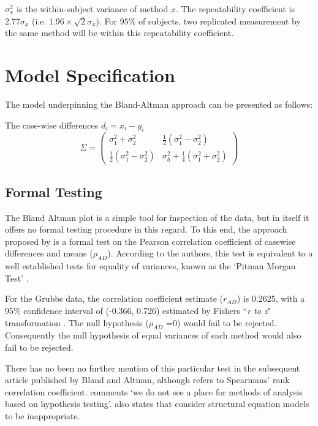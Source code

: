 \documentclass[12pt, a4paper]{report}
\theoremstyle{plain}
\theoremstyle{definition}
\theoremstyle{remark}
\begin{document}
$\sigma^2_{x}$ is the within-subject variance of method $x$. The repeatability coefficient is $2.77 \sigma_{x}$ (i.e. $1.96 \times \sqrt{2} \sigma_{x}$). For $95\%$ of subjects, two replicated measurement by the same method will be within this repeatability coefficient.

\newpage


\section{Model Specification}
The model underpinning the Bland-Altman approach can be presented as follows:



The case-wise differences $d_i = x_i - y_i$
\[
\Sigma = \left( \begin{array}{cc}
\sigma^2_1 + \sigma^2_2 &  \frac{1}{2}(\sigma^2_1 - \sigma^2_2) \\
\frac{1}{2}(\sigma^2_1 - \sigma^2_2) &   \sigma^2_b + \frac{1}{4}(\sigma^2_1 + \sigma^2_2)
\end{array}\right)
\]








\subsection{Formal Testing}
The Bland Altman plot is a simple tool for inspection of the data,
but in itself it offers no formal testing procedure in this regard. To this end, the approach proposed by \citet{BA83} is a formal test on the Pearson correlation coefficient  of casewise differences and means ($\rho_{AD}$). According to the authors, this test is equivalent to a well established tests for equality of variances, known as the `Pitman Morgan Test' \citep{Pitman,
	Morgan}.

For the Grubbs data, the correlation coefficient estimate ($r_{AD}$) is 0.2625, with a 95\% confidence interval of (-0.366,
0.726) estimated by Fishers ``\textit{r to z}" transformation \citep{Cohen}. The null hypothesis ($\rho_{AD}$ =0) would fail to be rejected.
Consequently the null hypothesis of equal variances of each method would also fail to be rejected.

There has no been no further mention of this particular test in the subsequent article published by Bland and Altman, although
\citet{BA99} refers to Spearmans' rank correlation coefficient. \citet{BA99} comments `we do not see a
place for methods of analysis based on hypothesis testing'. \citet{BA99} also states that consider structural equation models
to be inappropriate.
\end{document}
